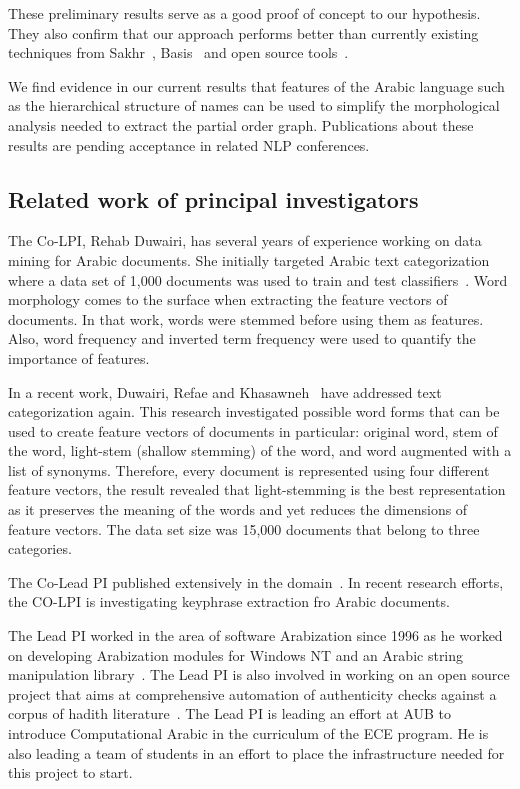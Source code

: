\documentclass[12pt]{article}
\begin{document}
These preliminary results serve as a good proof of concept to our 
hypothesis. They also confirm that our approach performs better than 
currently existing techniques from Sakhr~\cite{Sak09},
Basis~\cite{Bas09} and open source 
tools~\cite{Col09,Otakar:07,Tim04}.

We find evidence in our current results that features 
of the Arabic language such as the hierarchical structure of
names can be used to simplify the morphological analysis
needed to extract the partial order graph. 
Publications about these results are pending acceptance in 
related NLP conferences. 

\subsection{Related work of principal investigators}

The Co-LPI, Rehab Duwairi, has several years of experience 
working on data mining for Arabic documents. 
She initially targeted Arabic text categorization where a 
data set of 1,000 documents was used to train and test 
classifiers~\cite{Duw06,Duw07}.
Word morphology comes to the surface when extracting the 
feature vectors of documents. 
In that work, words were stemmed before using them as features. 
Also, word frequency and inverted term frequency were used to 
quantify the importance of features. 

In a recent work, Duwairi, Refae and Khasawneh~\cite{Duw09}
have addressed text categorization again. 
This research investigated possible word forms that can be 
used to create feature vectors of documents in particular: 
original word, stem of the word, light-stem (shallow stemming) 
of the word, and word augmented with a list of synonyms. 
Therefore, every document is represented using four different 
feature vectors, the result revealed that light-stemming is the 
best representation as it preserves the meaning of the words 
and yet reduces the dimensions of feature vectors. 
The data set size was 15,000 documents that belong to three 
categories. 

The Co-Lead PI published extensively in the 
domain~\cite{Duw06, Duw07, Duw09}.
In recent research efforts, the CO-LPI is investigating 
keyphrase extraction fro Arabic documents.

The Lead PI worked in the area of software Arabization since 1996 
as he worked on developing Arabization modules for Windows NT 
and an Arabic string manipulation library~\cite{Zar96}. 
The Lead PI is also involved in working on an open source 
project that aims at comprehensive automation of authenticity 
checks against a corpus of hadith literature~\cite{Zar06}.
The Lead PI is leading an effort at AUB to introduce 
Computational Arabic in the curriculum of the ECE program. 
He is also leading a team of students in an effort to place 
the infrastructure needed for this project to start. 
\end{document}
